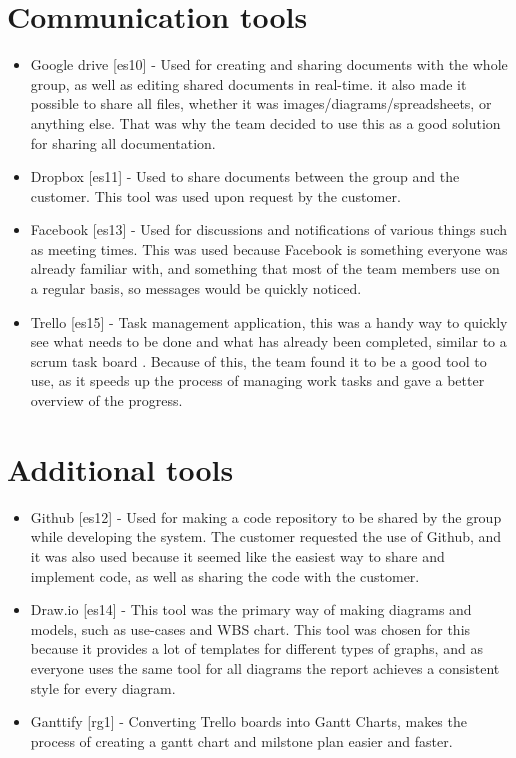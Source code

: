 \section{Communication tools}
\label{sec:communication tools}

\begin{itemize}
	\item Google drive [es10] - Used for creating and sharing documents with the whole group, as well as editing shared documents in real-time. it also made it possible to share all files, whether it was images/diagrams/spreadsheets, or anything else. That was why the team decided to use this as a good solution for sharing all documentation.
	\item Dropbox [es11] - Used to share documents between the group and the customer. This tool was used upon request by the customer.
	\item Facebook [es13] - Used for discussions and notifications of various things such as meeting times. This was used because Facebook is something everyone was already familiar with, and something that most of the team members use on a regular basis, so messages would be quickly noticed.
	\item Trello [es15] - Task management application, this was a handy way to quickly see what needs to be done and what has already been completed, similar to a scrum task board . Because of this, the team found it to be a good tool to use, as it speeds up the process of managing work tasks and gave a better overview of the progress.
\end{itemize}

\section{Additional tools}
\label{sec:additional_tools}

\begin{itemize}
	\item Github [es12] - Used for making a code repository to be shared by the group while developing the system. The customer requested the use of Github, and it was also used because it seemed like the easiest way to share and implement code, as well as sharing the code with the customer.
	\item Draw.io [es14] - This tool was the primary way of making diagrams and models, such as use-cases and WBS chart. This tool was chosen for this because it provides a lot of templates for different types of graphs, and as everyone uses the same tool for all diagrams the report achieves a consistent style for every diagram.
	\item Ganttify [rg1] - Converting Trello boards into Gantt Charts, makes the process of creating a gantt chart and milstone plan easier and faster.
\end{itemize}

\cleardoublepage